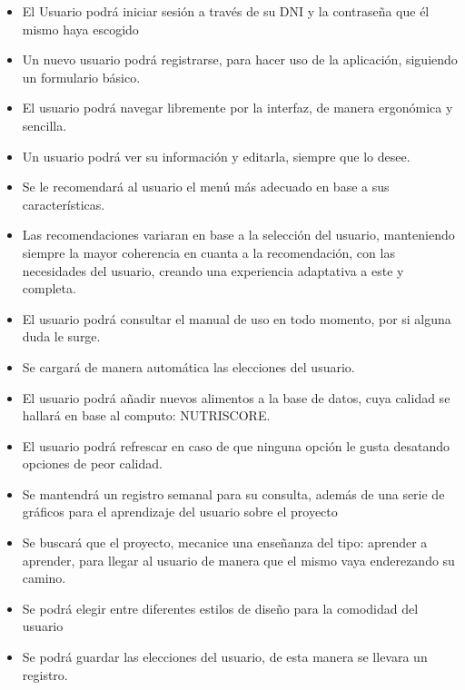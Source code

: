 \begin{itemize}

\item	El Usuario podrá iniciar sesión a través de su DNI y la contraseña que él mismo haya escogido
\item	Un nuevo usuario podrá registrarse, para hacer uso de la aplicación, siguiendo un formulario básico.
\item	El usuario podrá navegar libremente por la interfaz, de manera ergonómica y sencilla.
\item	Un usuario podrá ver su información y editarla, siempre que lo desee.
\item	Se le recomendará al usuario el menú más adecuado en base a sus características.
\item	Las recomendaciones variaran en base a la selección del usuario, manteniendo siempre la mayor coherencia en cuanta a la recomendación, con las necesidades del usuario, creando una experiencia adaptativa a este y completa.
\item	El usuario podrá consultar el manual de uso en todo momento, por si alguna duda le surge.
\item	Se cargará de manera automática las elecciones del usuario.
\item	El usuario podrá añadir nuevos alimentos a la base de datos, cuya calidad se hallará en base al computo: NUTRISCORE.
\item	El usuario podrá refrescar en caso de que ninguna opción le gusta desatando opciones de peor calidad.
\item	Se mantendrá un registro semanal para su consulta, además de una serie de gráficos para el aprendizaje del usuario sobre el proyecto
\item	Se buscará que el proyecto, mecanice una enseñanza del tipo: aprender a aprender, para llegar al usuario de manera que el mismo vaya enderezando su camino.
\item	Se podrá elegir entre diferentes estilos de diseño para la comodidad del usuario
\item	Se podrá guardar las elecciones del usuario, de esta manera se llevara un registro.
\end{itemize}

